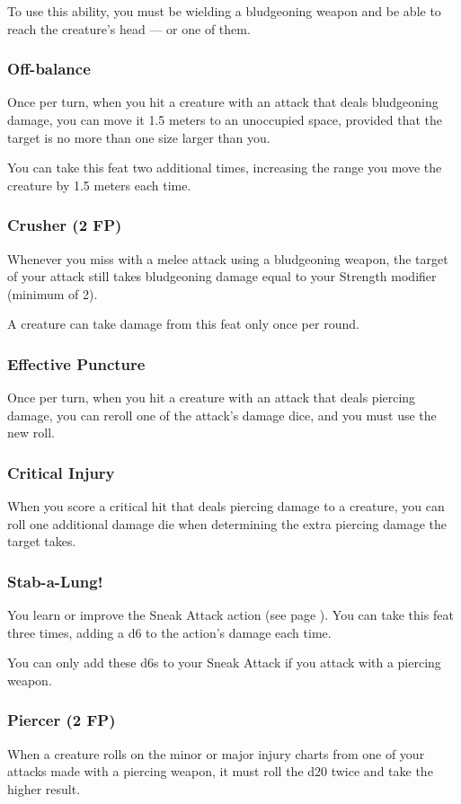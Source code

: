     To use this ability, you must be wielding a bludgeoning weapon and be able to reach the creature's head --- or one of them.
\subsubsection{Off-balance} \label{feat::offbalance}
    Once per turn, when you hit a creature with an attack that deals bludgeoning damage, you can move it 1.5 meters to an unoccupied space, provided that the target is no more than one size larger than you.

    You can take this feat two additional times, increasing the range you move the creature by 1.5 meters each time.
\subsubsection{Crusher (2 FP)} \label{feat::crusher}
    Whenever you miss with a melee attack using a bludgeoning weapon, the target of your attack still takes bludgeoning damage equal to your Strength modifier (minimum of 2).

    A creature can take damage from this feat only once per round.
\subsubsection{Effective Puncture} \label{feat::effectivepuncture}
    Once per turn, when you hit a creature with an attack that deals piercing damage, you can reroll one of the attack's damage dice, and you must use the new roll.
\subsubsection{Critical Injury} \label{feat::criticalinjury}
    When you score a critical hit that deals piercing damage to a creature, you can roll one additional damage die when determining the extra piercing damage the target takes.
\subsubsection{Stab-a-Lung!} \label{feat::stabalung}
    You learn or improve the Sneak Attack action (see page \pageref{act::sneakattack}).
    You can take this feat three times, adding a d6 to the action's damage each time.

    You can only add these d6s to your Sneak Attack if you attack with a piercing weapon.
\subsubsection{Piercer (2 FP)} \label{feat::piercer}
    When a creature rolls on the minor or major injury charts from one of your attacks made with a piercing weapon, it must roll the d20 twice and take the higher result.
